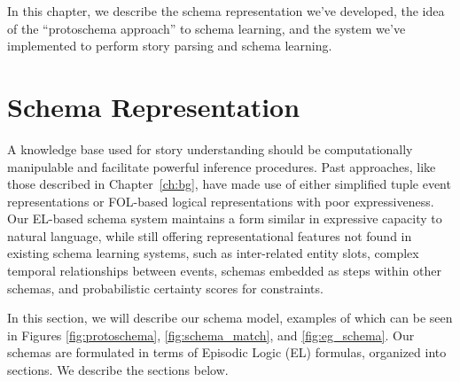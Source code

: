 


















\iffalse
In this chapter, we describe the schema representation we've developed, the idea of the ``protoschema approach'' to schema learning, and the system we've implemented to perform story parsing and schema learning.

\section{Schema Representation}
A knowledge base used for story understanding should be computationally manipulable and facilitate powerful inference procedures. Past approaches, like those described in Chapter~\ref{ch:bg}, have made use of either simplified tuple event representations or FOL-based logical representations with poor expressiveness. Our EL-based schema system maintains a form similar in expressive capacity to natural language, while still offering representational features not found in existing schema learning systems, such as inter-related entity slots, complex temporal relationships between events, schemas embedded as steps within other schemas, and probabilistic certainty scores for constraints.

In this section, we will describe our schema model, examples of which can be seen in Figures \ref{fig:protoschema}, \ref{fig:schema_match}, and \ref{fig:eg_schema}. Our schemas are formulated in terms of Episodic Logic (EL) formulas, organized into sections. We describe the sections below.

